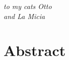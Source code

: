 \documentclass[12pt,	%
	a4paper,		%
	twoside,		%
	openright,		%
	titlepage,%
	]{book}
\theoremstyle{definition}
\let\cite\citep
\begin{document}
%
\frontmatter

% 

% 
%

% 
% 
% 
% 
% 
% 


\cleardoublepage
{}
\thispagestyle{empty}
\begin{flushright}
\textit{to my cats Otto\\ and La Micia}



\end{flushright}

\cleardoublepage

\chapter*{Abstract}

\end{document}
